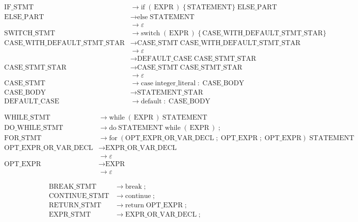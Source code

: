 \begin{align*}
\text{IF\_STMT}
  &\to \text{if}\;(\,\text{EXPR}\,)\;\{\,\text{STATEMENT}\}\;\text{ELSE\_PART}\\[6pt]
\text{ELSE\_PART}
  &\to \text{else}\;\text{STATEMENT}\\
  &\to \varepsilon\\[6pt]
\text{SWITCH\_STMT}
  &\to \text{switch}\;(\,\text{EXPR}\,)\;\{\,\text{CASE\_WITH\_DEFAULT\_STMT\_STAR}\}\\[6pt]
\text{CASE\_WITH\_DEFAULT\_STMT\_STAR}
  &\to \text{CASE\_STMT}\;\text{CASE\_WITH\_DEFAULT\_STMT\_STAR}\\
  &\to \varepsilon\\
  &\to \text{DEFAULT\_CASE}\;\text{CASE\_STMT\_STAR}\\[6pt]
\text{CASE\_STMT\_STAR}
  &\to \text{CASE\_STMT}\;\text{CASE\_STMT\_STAR}\\
  &\to \varepsilon\\[6pt]
\text{CASE\_STMT}
  &\to \text{case}\;\text{integer\_literal}\;:\;\text{CASE\_BODY}\\[6pt]
\text{CASE\_BODY}
  &\to \text{STATEMENT\_STAR}\\[6pt]
\text{DEFAULT\_CASE}
  &\to \text{default}\;:\;\text{CASE\_BODY}
\end{align*}

\begin{align*}
\text{WHILE\_STMT}
  &\to \text{while}\;(\,\text{EXPR}\,)\;\text{STATEMENT}\\[6pt]
\text{DO\_WHILE\_STMT}
  &\to \text{do}\;\text{STATEMENT}\;\text{while}\;(\,\text{EXPR}\,)\; ;\\[6pt]
\text{FOR\_STMT}
  &\to \text{for}\;( \text{OPT\_EXPR\_OR\_VAR\_DECL}\; ;\; \text{OPT\_EXPR}\; ;\; \text{OPT\_EXPR} )\;\text{STATEMENT}\\[6pt]
\text{OPT\_EXPR\_OR\_VAR\_DECL}
  &\to \text{EXPR\_OR\_VAR\_DECL}\\
  &\to \varepsilon\\[6pt]
\text{OPT\_EXPR}
  &\to \text{EXPR}\\
  &\to \varepsilon
\end{align*}

\begin{align*}
\text{BREAK\_STMT}
  &\to \text{break}\; ;\\[6pt]
\text{CONTINUE\_STMT}
  &\to \text{continue}\; ;\\[6pt]
\text{RETURN\_STMT}
  &\to \text{return}\;\text{OPT\_EXPR}\; ;\\[6pt]
\text{EXPR\_STMT}
  &\to \text{EXPR\_OR\_VAR\_DECL}\; ;
\end{align*}


